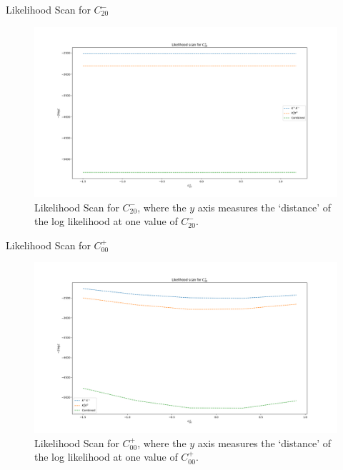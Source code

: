 \begin{frame}{Likelihood Scan for $C_{20}^{-}$}
\begin{figure}
    \centering
        \includegraphics[width=\textwidth]{2020_04_23/figs/P20.png}
    \caption{Likelihood Scan for $C_{20}^{-}$, where the $y$ axis measures the `distance' of the log likelihood at one value of $C_{20}^{-}$.}
    \label{fig:scanCM20}
\end{figure}
\end{frame}



\begin{frame}{Likelihood Scan for $C_{00}^{+}$}
\begin{figure}
    \centering
        \includegraphics[width=\textwidth]{2020_04_23/figs/P00.png}
    \caption{Likelihood Scan for $C_{00}^{+}$, where the $y$ axis measures the `distance' of the log likelihood at one value of $C_{00}^{+}$.}
    \label{fig:scanCP01}
\end{figure}
\end{frame}

